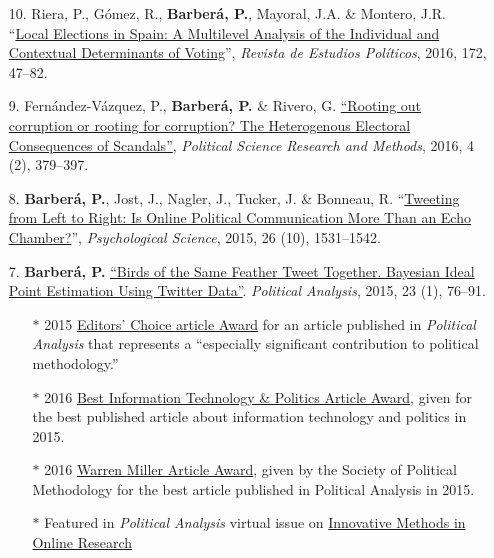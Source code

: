 \documentclass[margin,line,11pt]{resume}
\begin{document}
\begin{resume}
\begin{itemize}[leftmargin=5.5mm]
\item[10.] Riera, P., G\'{o}mez, R., \textbf{Barber\'{a}, P.}, Mayoral, J.A. \& Montero, J.R. ``\href{http://www.cepc.gob.es/publicaciones/revistas/revistaselectronicas?IDR=3&IDN=1360&IDA=37721}{Local Elections in Spain: A Multilevel Analysis of the Individual and Contextual Determinants of Voting}'', \textit{Revista de Estudios Pol\'{i}ticos}, 2016, 172, 47--82.

\newpage

\item[9.] Fern\'{a}ndez-V\'{a}zquez, P., \textbf{Barber\'{a}, P.} \& Rivero, G. \href{http://dx.doi.org/10.1017/psrm.2015.8}{``Rooting out corruption or rooting for corruption? The Heterogenous Electoral Consequences of Scandals''}, \textit{Political Science Research and Methods}, 2016, 4 (2), 379--397.

\item[8.] \textbf{Barber\'{a}, P.}, Jost, J., Nagler, J., Tucker, J. \& Bonneau, R. ``\href{http://pss.sagepub.com/content/early/2015/08/21/0956797615594620}{Tweeting from Left to Right: Is Online Political Communication More Than an Echo Chamber?}'', \textit{Psychological Science}, 2015, 26 (10), 1531--1542.

\item[7.] \textbf{Barber\'{a}, P.} \href{http://pan.oxfordjournals.org/cgi/reprint/mpu011?ijkey=uMFPw4dsMHM7608&keytype=ref}{``Birds of the Same Feather Tweet Together. Bayesian Ideal Point Estimation Using Twitter Data''}. \emph{Political Analysis}, 2015, 23 (1), 76--91.
\begin{itemize}
\item[] $\ast$ 2015 \href{http://oxfordjournals.org/our_journals/polana/editorschoice.html}{Editors' Choice article Award} for an article published in \textit{Political Analysis} that represents a ``especially significant contribution to political methodology.''
\vspace{-.1cm}
\item[] $\ast$ 2016 \href{http://www.apsanet.org/section-18-best-information-technology-and-politicsp-award}{Best Information Technology \& Politics Article Award}, given for the best published article about information technology and politics in 2015.
\vspace{-.1cm}
\item[] $\ast$ 2016 \href{http://www.oxfordjournals.org/our_journals/polana/awards_warrenmiller.html}{Warren Miller Article Award}, given by the Society of Political Methodology for the best article published in Political Analysis in 2015.
\vspace{-.1cm}
\item[] $\ast$ Featured in \textit{Political Analysis} virtual issue on \href{https://www.cambridge.org/core/journals/political-analysis/issue/online-research-methods/FF4E7D31B561F7FC794AF5894A53E9F3}{Innovative Methods in Online Research}
\end{itemize}



\end{itemize}
\end{resume}
\end{document}
